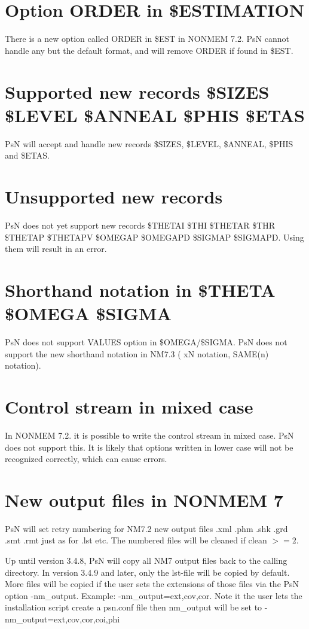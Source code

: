\section{Option ORDER in \$ESTIMATION}
There is a new option called ORDER in \$EST in NONMEM 7.2. PsN cannot handle any but the default format, and will remove ORDER if found in \$EST.

\section{Supported new records \$SIZES \$LEVEL \$ANNEAL \$PHIS \$ETAS}
PsN will accept and handle new records \$SIZES, \$LEVEL, \$ANNEAL, \$PHIS and \$ETAS.

\section{Unsupported new records}
PsN does not yet support new records \$THETAI \$THI \$THETAR \$THR \$THETAP \$THETAPV \$OMEGAP \$OMEGAPD
\$SIGMAP \$SIGMAPD. Using them will result in an error.

\section{Shorthand notation in \$THETA \$OMEGA \$SIGMA}
PsN does not support VALUES option in \$OMEGA/\$SIGMA. 
PsN does not support the new shorthand notation in NM7.3 ( xN notation, SAME(n) notation).

\section{Control stream in mixed case}
In NONMEM 7.2. it is possible to write the control stream in mixed case. PsN does not support this. It is likely that options written in lower case will not be recognized correctly, which can cause errors.

\section{New output files in NONMEM 7}

PsN will set retry numbering for NM7.2 new output files .xml .phm .shk .grd .smt .rmt just as for .lst etc. The numbered files will be cleaned if clean $>=2$.

Up until version 3.4.8, PsN will copy all NM7 output files back to the calling directory. In version 3.4.9 and later, only the lst-file will be copied by default. More files will be copied if the user sets the extensions of those files via the PsN option -nm\_output. Example: -nm\_output=ext,cov,cor. Note it the user lets the installation script create a psn.conf file then nm\_output will be set to -nm\_output=ext,cov,cor,coi,phi 

